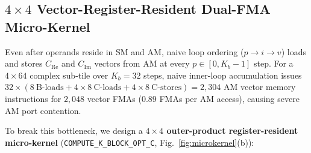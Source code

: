 \documentclass[journal]{IEEEtran}
\begin{document}
\subsection{$4 \times 4$ Vector-Register-Resident Dual-FMA Micro-Kernel}
Even after operands reside in SM and AM, naive loop ordering ($p \to i \to v$) loads and stores $C_{\mathrm{Re}}$ and $C_{\mathrm{Im}}$ vectors from AM at every $p \in [0, K_b - 1]$ step. For a $4 \times 64$ complex sub-tile over $K_b = 32$ steps, naive inner-loop accumulation issues $32 \times (8~\text{B-loads} + 4 \times 8~\text{C-loads} + 4 \times 8~\text{C-stores}) = 2{,}304$ AM vector memory instructions for $2{,}048$ vector FMAs ($0.89$ FMAs per AM access), causing severe AM port contention.

To break this bottleneck, we design a \textbf{$4 \times 4$ outer-product register-resident micro-kernel} (\texttt{COMPUTE\_K\_BLOCK\_OPT\_C}, Fig.~\ref{fig:microkernel}(b)):
\end{document}
